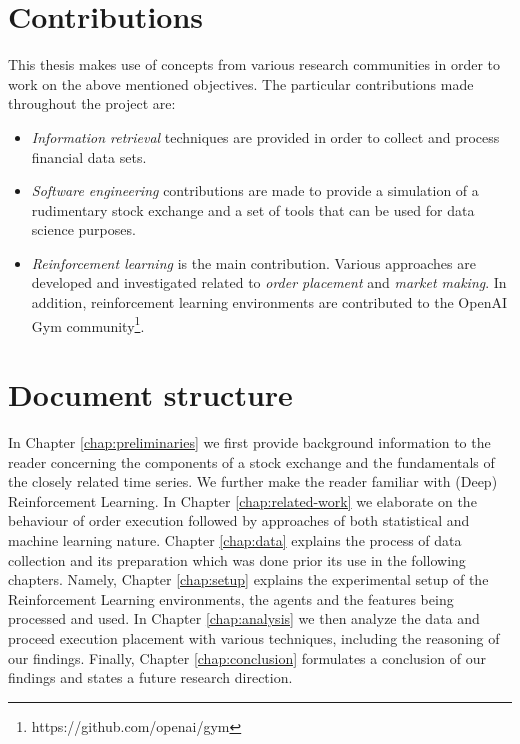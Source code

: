 \section{Contributions}

This thesis makes use of concepts from various research communities in order to work on the above mentioned objectives.
The particular contributions made throughout the project are:
\begin{itemize}
    \item \textit{Information retrieval} techniques are provided in order to collect and process financial data sets.
    \item \textit{Software engineering} contributions are made to provide a simulation of a rudimentary stock exchange and a set of tools that can be used for data science purposes.
    \item \textit{Reinforcement learning} is the main contribution. 
    Various approaches are developed and investigated related to \textit{order placement} and \textit{market making}.
    In addition, reinforcement learning environments are contributed to the OpenAI Gym community\footnote{https://github.com/openai/gym}.
\end{itemize}


\section{Document structure}

In Chapter \ref{chap:preliminaries} we first provide background information to the reader concerning the components of a stock exchange and the fundamentals of the closely related time series.
We further make the reader familiar with (Deep) Reinforcement Learning.
In Chapter \ref{chap:related-work} we elaborate on the behaviour of order execution followed by approaches of both statistical and machine learning nature.
Chapter \ref{chap:data} explains the process of data collection and its preparation which was done prior its use in the following chapters.
Namely, Chapter \ref{chap:setup} explains the experimental setup of the Reinforcement Learning environments, the agents and the features being processed and used.
In Chapter \ref{chap:analysis} we then analyze the data and proceed execution placement with various techniques, including the reasoning of our findings.
Finally, Chapter \ref{chap:conclusion} formulates a conclusion of our findings and states a future research direction.
